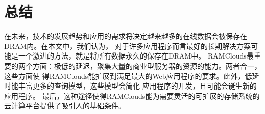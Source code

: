 \documentclass[translation]{zjutreport}
\begin{document}
\chapter{总结}
在未来，技术的发展趋势和应用的需求将决定越来越多的在线数据会被保存在DRAM内。在本文中，我们认为，
对于许多应用程序而言最好的长期​​解决方案可能是一个激进的方法，就是将所有数据永久的保存在DRAM中。
RAMClouds最重要的两个方面：极低的延迟，聚集大量的商业型服务器的资源的能力。两者合一，这些方面使
得RAMClouds能扩展到满足最大的Web应用程序的要求。此外，低延时能丰富更多的查询模型，这些模型会简化
应用程序的开发，且可能会诞生新的应用程序。
最后，这种途径使得RAMClouds能为需要灵活的可扩展的存储系统的
云计算平台提供了吸引人的基础条件。

\backmatter %
\endgroup %

\clearpage %

\nocite{*}                                   %


\end{document}
